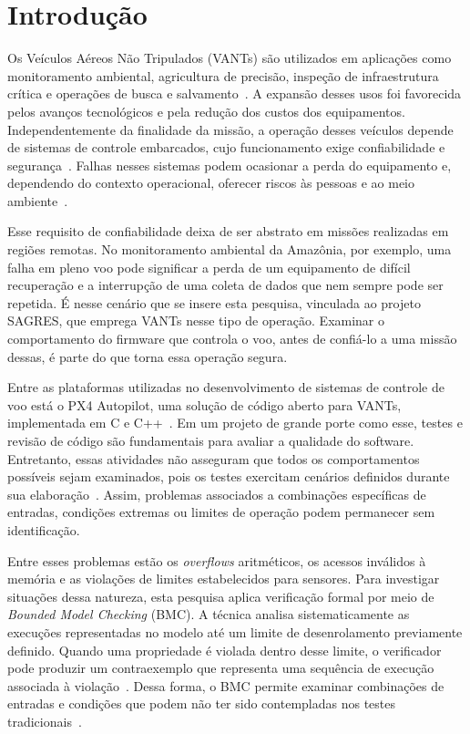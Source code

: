 \chapter{Introdução}
\label{cap:introducao}

Os Veículos Aéreos Não Tripulados (VANTs) são utilizados em aplicações como monitoramento ambiental, agricultura de precisão, inspeção de infraestrutura crítica e operações de busca e salvamento~\cite{Wanner2024,Siddiqi2022}. A expansão desses usos foi favorecida pelos avanços tecnológicos e pela redução dos custos dos equipamentos. Independentemente da finalidade da missão, a operação desses veículos depende de sistemas de controle embarcados, cujo funcionamento exige confiabilidade e segurança~\cite{Mohsan2023}. Falhas nesses sistemas podem ocasionar a perda do equipamento e, dependendo do contexto operacional, oferecer riscos às pessoas e ao meio ambiente~\cite{Wanner2024}.

Esse requisito de confiabilidade deixa de ser abstrato em missões realizadas em regiões remotas. No monitoramento ambiental da Amazônia, por exemplo, uma falha em pleno voo pode significar a perda de um equipamento de difícil recuperação e a interrupção de uma coleta de dados que nem sempre pode ser repetida. É nesse cenário que se insere esta pesquisa, vinculada ao projeto SAGRES, que emprega VANTs nesse tipo de operação. Examinar o comportamento do firmware que controla o voo, antes de confiá-lo a uma missão dessas, é parte do que torna essa operação segura.

Entre as plataformas utilizadas no desenvolvimento de sistemas de controle de voo está o PX4 Autopilot, uma solução de código aberto para VANTs, implementada em C e C++~\cite{PX4_GitHub}. Em um projeto de grande porte como esse, testes e revisão de código são fundamentais para avaliar a qualidade do software. Entretanto, essas atividades não asseguram que todos os comportamentos possíveis sejam examinados, pois os testes exercitam cenários definidos durante sua elaboração~\cite{Godefroid2005}. Assim, problemas associados a combinações específicas de entradas, condições extremas ou limites de operação podem permanecer sem identificação.

Entre esses problemas estão os \textit{overflows} aritméticos, os acessos inválidos à memória e as violações de limites estabelecidos para sensores. Para investigar situações dessa natureza, esta pesquisa aplica verificação formal por meio de \textit{Bounded Model Checking} (BMC). A técnica analisa sistematicamente as execuções representadas no modelo até um limite de desenrolamento previamente definido. Quando uma propriedade é violada dentro desse limite, o verificador pode produzir um contraexemplo que representa uma sequência de execução associada à violação~\cite{Biere1999}. Dessa forma, o BMC permite examinar combinações de entradas e condições que podem não ter sido contempladas nos testes tradicionais~\cite{Beyer2022}.

